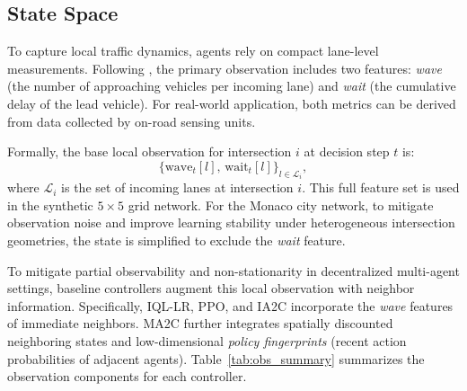 \documentclass[lettersize,journal]{IEEEtran}
\begin{document}

\subsection{State Space}

To capture local traffic dynamics, agents rely on compact lane-level measurements. Following \cite{chu2019multi}, the primary observation includes two features: \emph{wave} (the number of approaching vehicles per incoming lane) and \emph{wait} (the cumulative delay of the lead vehicle). For real-world application, both metrics can be derived from data collected by on-road sensing units.

Formally, the base local observation for intersection $i$ at decision step $t$ is:
\begin{equation}
\bigl\{\text{wave}_t[l],\, \text{wait}_t[l]\bigr\}_{l \in \mathcal{L}_i},
\end{equation}
where $\mathcal{L}_i$ is the set of incoming lanes at intersection $i$. This full feature set is used in the synthetic $5\times5$ grid network. For the Monaco city network, to mitigate observation noise and improve learning stability under heterogeneous intersection geometries, the state is simplified to exclude the \emph{wait} feature.

To mitigate partial observability and non-stationarity in decentralized multi-agent settings, baseline controllers augment this local observation with neighbor information. Specifically, IQL-LR, PPO, and IA2C incorporate the \emph{wave} features of immediate neighbors. MA2C further integrates spatially discounted neighboring states and low-dimensional \emph{policy fingerprints} (recent action probabilities of adjacent agents). Table~\ref{tab:obs_summary} summarizes the observation components for each controller.

\end{document}
